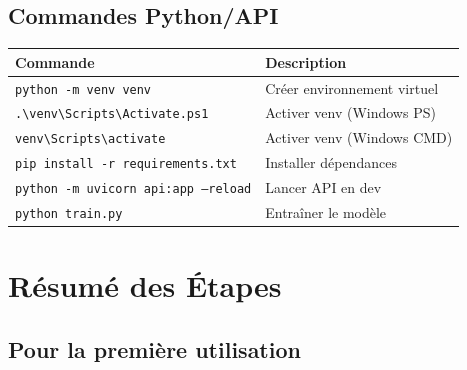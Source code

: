 \documentclass[12pt,a4paper]{article}
\begin{document}
\subsection{Commandes Python/API}

\begin{table}[h]
\centering
\small
\begin{tabular}{|p{4cm}|p{8cm}|}
\hline
\textbf{Commande} & \textbf{Description} \\
\hline
\texttt{python -m venv venv} & Créer environnement virtuel \\
\hline
\texttt{.\textbackslash venv\textbackslash Scripts\textbackslash Activate.ps1} & Activer venv (Windows PS) \\
\hline
\texttt{venv\textbackslash Scripts\textbackslash activate} & Activer venv (Windows CMD) \\
\hline
\texttt{pip install -r requirements.txt} & Installer dépendances \\
\hline
\texttt{python -m uvicorn api:app --reload} & Lancer API en dev \\
\hline
\texttt{python train.py} & Entraîner le modèle \\
\hline
\end{tabular}
\end{table}

\newpage

\section{Résumé des Étapes}

\subsection{Pour la première utilisation}
\end{document}

